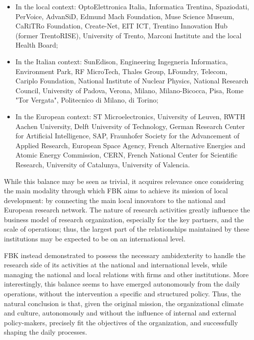\begin{itemize}

\item In the local context: OptoElettronica Italia, Informatica Trentina, Spaziodati, PerVoice, AdvanSiD, Edmund Mach Foundation, Muse Science Museum, CaRiTRo Foundation, Create-Net, EIT ICT, Trentino Innovation Hub (former TrentoRISE), University of Trento, Marconi Institute and the local Health Board;

\item In the Italian context: SunEdison, Engineering Ingegneria Informatica, Environment Park, RF MicroTech, Thales Group, LFoundry, Telecom, Cariplo Foundation, National Institute of Nuclear Physics, National Research Council, University of Padova, Verona, Milano, Milano-Bicocca, Pisa, Rome "Tor Vergata", Politecnico di Milano, di Torino;

\item In the European context: ST Microelectronics, University of Leuven, RWTH Aachen University, Delft University of Technology, German Research Center for Artificial Intelligence, SAP, Fraunhofer Society for the Advancement of Applied Research, European Space Agency, French Alternative Energies and Atomic Energy Commission,  CERN, French National Center for Scientific Research, University of Catalunya, University of Valencia.

\end{itemize}

While this balance may be seen as trivial, it acquires relevance once considering the main modality through which FBK aims to achieve its mission of local development: by connecting the main local innovators to the national and European research network. The nature of research activities greatly influence the business model of research organization, especially for the key partners, and the scale of operations; thus, the largest part of the relationships maintained by these institutions may be expected to be on an international level. 

FBK instead demonstrated to possess the necessary ambidexterity to handle the research side of its activities at the national and international levels, while managing the national and local relations with firms and other institutions. More interestingly, this balance seems to have emerged autonomously from the daily operations, without the intervention a specific and structured policy. Thus, the natural conclusion is that, given the original mission, the organizational climate and culture, autonomously and without the influence of internal and external policy-makers, precisely fit the objectives of the organization, and successfully shaping the daily processes.  

